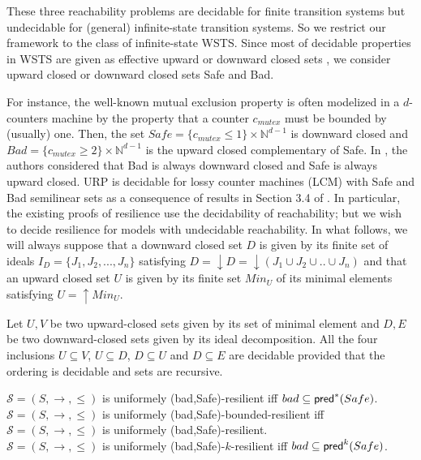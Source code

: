 
These three reachability problems are decidable for finite transition systems but undecidable for (general) infinite-state transition systems. 
So we restrict our framework to the class of infinite-state WSTS. Since most of decidable properties in WSTS are given as effective upward or downward closed sets \cite{DBLP:journals/iandc/AbdullaCJT00, DBLP:journals/tcs/FinkelS01}, we consider upward closed or downward closed sets Safe and Bad.

For instance, the well-known mutual exclusion property is often modelized in a $d$-counters machine by the property that a counter $c_{mutex}$ must be bounded by (usually) one. Then, the set $Safe =  \{c_{mutex} \leq 1\} \times \mathbb{N}^{d-1}$ is downward closed and $Bad =\{c_{mutex} \geq 2\} \times  \mathbb{N}^{d-1} $ is the upward closed complementary of Safe. In \cite{DBLP:conf/gg/Ozkan22}, the authors considered that Bad is always downward closed and Safe is always upward closed.
%		
URP is decidable for lossy counter machines (LCM) with Safe and Bad semilinear sets as a consequence of results in Section 3.4 of \cite{DBLP:conf/rp/Schnoebelen10}. In particular, the existing proofs of resilience use the decidability of reachability; but we wish to decide resilience for models with undecidable reachability.
%
In what follows, we will always suppose that a downward closed set $D$ is given by its finite set of ideals $I_D=\{J_1, J_2,...,J_n\}$ satisfying $D=\downarrow D = \downarrow (J_1 \cup J_2 \cup..\cup J_n)$ and that an upward closed set $U$ is given by its finite set $Min_U$ of its minimal elements satisfying $U=\uparrow Min_U$.

Let $U,V$ be two upward-closed sets given by its set of minimal element and $D,E$ be two downward-closed sets given by its ideal decomposition. All the four  inclusions $U \subseteq V$,  $U \subseteq D$, $D \subseteq U$ and $D \subseteq E$ are decidable provided that the ordering is decidable and sets are recursive.
%


\begin{proposition}\label{general}
$\mathscr{S}=(S,\rightarrow,\leq)$ is uniformely (bad,Safe)-resilient iff $bad \subseteq \textsf{pred}^*(Safe)$.\\
$\mathscr{S}=(S,\rightarrow,\leq)$ is uniformely (bad,Safe)-bounded-resilient iff $\mathscr{S}=(S,\rightarrow,\leq)$ is uniformely (bad,Safe)-resilient.\\
$\mathscr{S}=(S,\rightarrow,\leq)$ is uniformely (bad,Safe)-$k$-resilient iff $bad \subseteq \textsf{pred}^k(Safe)$.
\end{proposition}

